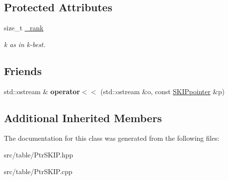 \subsection*{Protected Attributes}
\begin{DoxyCompactItemize}
\item 
\mbox{\label{classSKIPpointer_a54ba5b0ffdc369da69f394b791a8b7f2}} 
size\+\_\+t \mbox{\hyperlink{classSKIPpointer_a54ba5b0ffdc369da69f394b791a8b7f2}{\+\_\+rank}}
\begin{DoxyCompactList}\small\item\em k as in k-\/best. \end{DoxyCompactList}\end{DoxyCompactItemize}
\subsection*{Friends}
\begin{DoxyCompactItemize}
\item 
\mbox{\label{classSKIPpointer_a015154c0d3f197a32544c20ea2f70c10}} 
std\+::ostream \& {\bfseries operator$<$$<$} (std\+::ostream \&o, const \mbox{\hyperlink{classSKIPpointer}{S\+K\+I\+Ppointer}} \&p)
\end{DoxyCompactItemize}
\subsection*{Additional Inherited Members}


The documentation for this class was generated from the following files\+:\begin{DoxyCompactItemize}
\item 
src/table/Ptr\+S\+K\+I\+P.\+hpp\item 
src/table/Ptr\+S\+K\+I\+P.\+cpp\end{DoxyCompactItemize}
